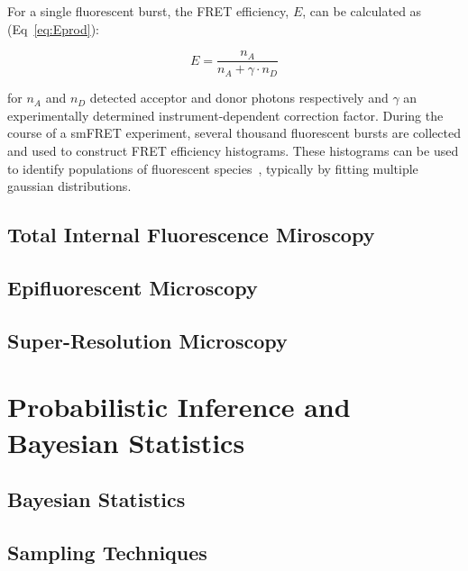 For a single fluorescent burst, the FRET efficiency, $E$, can be calculated as (Eq~\ref{eq:Eprod}):

\begin{equation}
E = \frac{n_A}{n_A + \gamma \cdot n_D}
\label{eq:Eprod}
\end{equation} 

for $n_A$ and $n_D$ detected acceptor and donor photons respectively and $\gamma$ an experimentally determined instrument-dependent correction factor. During the course of a smFRET experiment, several thousand fluorescent bursts are collected and used to construct FRET efficiency histograms. These histograms can be used to identify populations of fluorescent species~\cite{ha96}, typically by fitting multiple gaussian distributions.

\subsection{Total Internal Fluorescence Miroscopy}

\subsection{Epifluorescent Microscopy}

\subsection{Super-Resolution Microscopy}

\section{Probabilistic Inference and Bayesian Statistics}
\subsection{Bayesian Statistics}
\subsection{Sampling Techniques}
